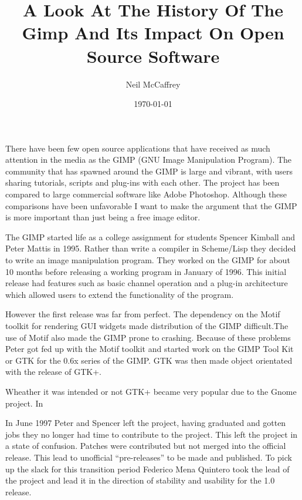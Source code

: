 \documentclass[a4 paper, 12pt]{article}
\begin{document}
\author{Neil McCaffrey}
\title{A Look At The History Of The Gimp And Its Impact On Open Source
Software}
\date{\today}
\maketitle


	There have been few open source applications that have received as much
	attention in the media as the GIMP (GNU Image Manipulation Program). The
	community that has spawned around the GIMP is large and vibrant, with users
	sharing tutorials, scripts and plug-ins with each other. The project has been
	compared to large commercial software like Adobe Photoshop.  Although these
	comparisons have been unfavorable I want to make the argument that the GIMP
	is more important than just being a free image editor.

	The GIMP started life as a college assignment for students Spencer Kimball
	and Peter Mattis in 1995. Rather than write a compiler in Scheme/Lisp they
	decided to write an image manipulation program. They worked on the GIMP for
	about 10 months before releasing a working program in January of 1996. This
	initial release had features such as basic channel operation and a plug-in
	architecture which allowed users to extend the functionality of the
	program.

	However the first release was far from perfect. The dependency on the Motif
	toolkit for rendering GUI widgets made distribution of the GIMP
	difficult.The use of Motif also made the GIMP prone to crashing.  Because
	of these problems Peter got fed up with the Motif toolkit and started work
	on the GIMP Tool Kit or GTK for the 0.6x series of the GIMP.  GTK was then
	made object orientated with the release of GTK+.

	Wheather it was intended or not GTK+ became very popular due to the Gnome
	project. In 

	In June 1997 Peter and Spencer left the project, having graduated and gotten
	jobs they no longer had time to contribute to the project. This left the
	project in a state of confusion. Patches were contributed but not merged
	into the official release. This lead to unofficial ``pre-releases'' to be
	made and published. To pick up the slack for this transition period Federico
	Mena Quintero took the lead of the project and lead it in the direction of
	stability and usability for the 1.0 release.
\end{document}
